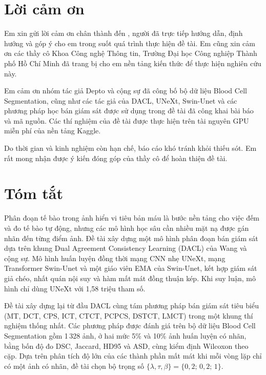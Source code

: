 \documentclass[12pt,a4paper,oneside]{report}
\begin{document}
\chapter*{Lời cảm ơn}

Em xin gửi lời cảm ơn chân thành đến \underline{\hspace{5cm}}, người đã trực tiếp hướng dẫn, định hướng và góp ý cho em trong suốt quá trình thực hiện đề tài. Em cũng xin cảm ơn các thầy cô Khoa Công nghệ Thông tin, Trường Đại học Công nghiệp Thành phố Hồ Chí Minh đã trang bị cho em nền tảng kiến thức để thực hiện nghiên cứu này.

Em cảm ơn nhóm tác giả Depto và cộng sự đã công bố bộ dữ liệu Blood Cell Segmentation, cũng như các tác giả của DACL, UNeXt, Swin-Unet và các phương pháp học bán giám sát được sử dụng trong đề tài đã công khai bài báo và mã nguồn. Các thí nghiệm của đề tài được thực hiện trên tài nguyên GPU miễn phí của nền tảng Kaggle.

Do thời gian và kinh nghiệm còn hạn chế, báo cáo khó tránh khỏi thiếu sót. Em rất mong nhận được ý kiến đóng góp của thầy cô để hoàn thiện đề tài.

\chapter*{Tóm tắt}

Phân đoạn tế bào trong ảnh hiển vi tiêu bản máu là bước nền tảng cho việc đếm và đo tế bào tự động, nhưng các mô hình học sâu cần nhiều mặt nạ được gán nhãn đến từng điểm ảnh. Đề tài xây dựng một mô hình phân đoạn bán giám sát dựa trên khung Dual Agreement Consistency Learning (DACL) của Wang và cộng sự. Mô hình huấn luyện đồng thời mạng CNN nhẹ UNeXt, mạng Transformer Swin-Unet và một giáo viên EMA của Swin-Unet, kết hợp giám sát giả chéo, nhất quán nội suy và hàm mất mát đồng thuận kép. Khi suy luận, mô hình chỉ dùng UNeXt với 1,58 triệu tham số.

Đề tài xây dựng lại từ đầu DACL cùng tám phương pháp bán giám sát tiêu biểu (MT, DCT, CPS, ICT, CTCT, PCPCS, DSTCT, LMCT) trong một khung thí nghiệm thống nhất. Các phương pháp được đánh giá trên bộ dữ liệu Blood Cell Segmentation gồm 1\,328 ảnh, ở hai mức 5\% và 10\% ảnh huấn luyện có nhãn, bằng bốn độ đo DSC, Jaccard, HD95 và ASD, cùng kiểm định Wilcoxon theo cặp. Dựa trên phân tích độ lớn của các thành phần mất mát khi mỗi vòng lặp chỉ có một ảnh có nhãn, đề tài chọn bộ trọng số $\{\lambda,\tau,\beta\}=\{0{,}2;\,0{,}2;\,1\}$.
\end{document}
